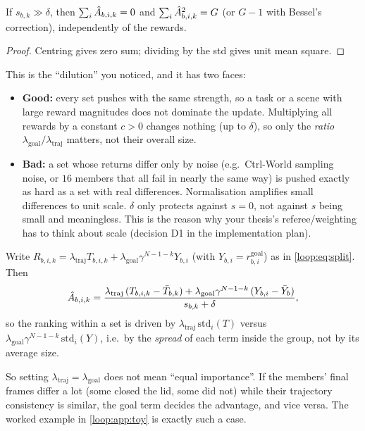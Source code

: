 \begin{proposition}\label{loop:prop:budget}
If $s_{b,k}\gg\delta$, then $\sum_{i}\hat A_{b,i,k}=0$ and $\sum_i\hat A_{b,i,k}^2=G$ (or $G-1$ with Bessel's correction), independently of the rewards.
\end{proposition}
\begin{proof}
Centring gives zero sum; dividing by the std gives unit mean square.
\end{proof}
This is the ``dilution'' you noticed, and it has two faces:
\begin{itemize}
\item \textbf{Good:} every set pushes with the same strength, so a task or a scene with large reward magnitudes does not dominate the update. Multiplying all rewards by a constant $c>0$ changes nothing (up to $\delta$), so only the \emph{ratio} $\lambda_{\mathrm{goal}}/\lambda_{\mathrm{traj}}$ matters, not their overall size.
\item \textbf{Bad:} a set whose returns differ only by noise (e.g.\ Ctrl-World sampling noise, or $16$ members that all fail in nearly the same way) is pushed exactly as hard as a set with real differences. Normalisation amplifies small differences to unit scale. $\delta$ only protects against $s=0$, not against $s$ being small and meaningless. This is the reason why your thesis's referee/weighting has to think about scale (decision D1 in the implementation plan).
\end{itemize}

\begin{proposition}\label{loop:prop:mix}
Write $R_{b,i,k}=\lambda_{\mathrm{traj}}T_{b,i,k}+\lambda_{\mathrm{goal}}\gamma^{N-1-k}Y_{b,i}$ (with $Y_{b,i}=r^{\mathrm{goal}}_{b,i}$) as in \eqref{loop:eq:split}. Then
\[
\hat A_{b,i,k}=\frac{\lambda_{\mathrm{traj}}\,(T_{b,i,k}-\bar T_{b,k})+\lambda_{\mathrm{goal}}\gamma^{N-1-k}\,(Y_{b,i}-\bar Y_{b})}{s_{b,k}+\delta},
\]
so the ranking within a set is driven by $\lambda_{\mathrm{traj}}\,\mathrm{std}_i(T)$ versus $\lambda_{\mathrm{goal}}\gamma^{N-1-k}\,\mathrm{std}_i(Y)$, i.e.\ by the \emph{spread} of each term inside the group, not by its average size.
\end{proposition}
So setting $\lambda_{\mathrm{traj}}=\lambda_{\mathrm{goal}}$ does not mean ``equal importance''. If the members' final frames differ a lot (some closed the lid, some did not) while their trajectory consistency is similar, the goal term decides the advantage, and vice versa. The worked example in \cref{loop:app:toy} is exactly such a case.

